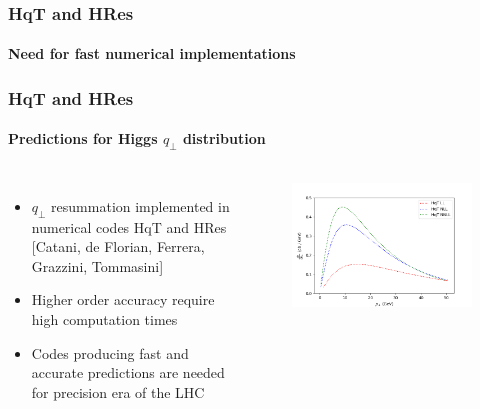 \documentclass[aspectratio=43]{beamer}
\begin{document}
%
%

\begin{frame}


\end{frame}

\begin{frame}
	
	\frametitle{HqT and HRes}
	\framesubtitle{Need for fast numerical implementations}

\end{frame}

\begin{frame}

	\frametitle{HqT and HRes}
	\framesubtitle{Predictions for Higgs $q_{\perp}$ distribution}
	
	\begin{columns}
		
			
		\begin{itemize}
			\item $q_{\perp}$ resummation implemented in numerical codes HqT and HRes {\color{blue}[Catani, de Florian, Ferrera, Grazzini, Tommasini]} 
			\item Higher order accuracy require {\color{red}high computation times}
			\item Codes producing fast and accurate predictions are needed for precision era of the LHC
		\end{itemize}

	
		\begin{figure}
			\includegraphics[width = 7 cm]{plots/part3/higgs_qt_all.png}
		\end{figure}		
			
	\end{columns}

\end{frame}
\end{document}
